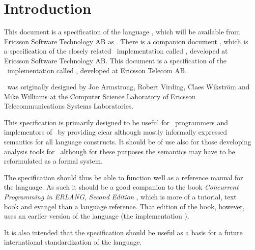 %
%
%
%
%
%
%

\chapter{Introduction}

\ifStd
{}
This document is a specification of the language \StdErlang, which will
be available from Ericsson Software Technology AB as \NewErlang. There is a
companion document \cite{olderlang}, which is a specification of the
closely related \Erlang\ implementation
called \OldErlang, developed at Ericsson Software Technology AB.
\else
{}
This document is a specification of the \Erlang\ implementation called
, developed at Ericsson Telecom AB.
\fi

\Erlang\ was originally designed by Joe Armstrong,
Robert Virding, Claes
Wikstr\"{o}m and Mike
Wil\-liams at the Computer Science Laboratory of
Ericsson Telecommunications Systems Laboratories.

This specification is primarily designed to be useful for \Erlang\
programmers and implementors of \Erlang\ by providing clear although
mostly informally expressed semantics for all language constructs.
It should be of use also for those developing analysis tools for
\Erlang\ although for these purposes the semantics may have to be
reformulated as a formal system.

The specification should thus be able to function well as a reference
manual for the language.  As such it should be a good companion to the
book \emph{Concurrent Programming in ERLANG, Second Edition}
\cite{erlbook}, which is more of a tutorial, text book and evangel
than a language reference.  That edition of the book, however, uses an
earlier version of the language (the implementation \ErlVsn{4.3}).

It is also intended that the specification should be useful as a basis for
a future international standardization of the language.
